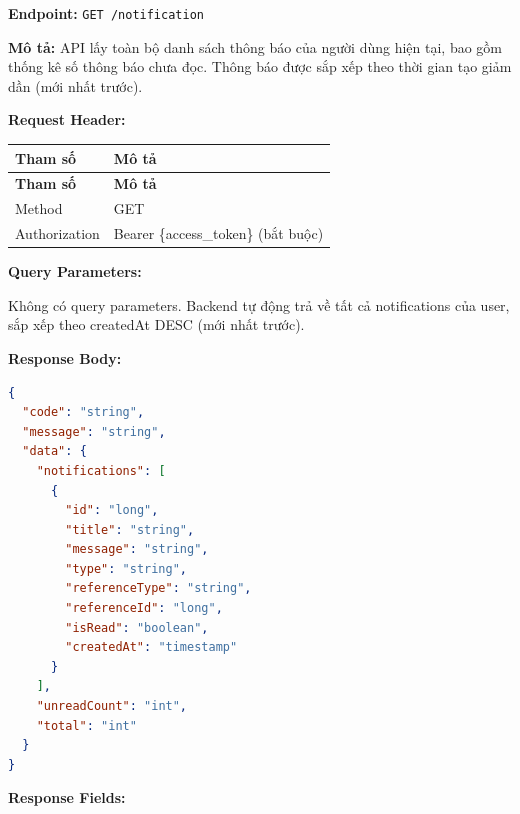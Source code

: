 \textbf{Endpoint:} \texttt{GET /notification}

\textbf{Mô tả:} API lấy toàn bộ danh sách thông báo của người dùng hiện tại, bao gồm thống kê số thông báo chưa đọc. Thông báo được sắp xếp theo thời gian tạo giảm dần (mới nhất trước).

\textbf{Request Header:}

\begin{longtable}{|p{}|p{}|}
\hline
\textbf{Tham số} & \textbf{Mô tả} \\
\hline
\endfirsthead

\hline
\textbf{Tham số} & \textbf{Mô tả} \\
\hline
\endhead

\hline
\endfoot

Method & GET \\
\hline
Authorization & Bearer \{access\_token\} (bắt buộc) \\
\hline
\end{longtable}

\textbf{Query Parameters:}

Không có query parameters. Backend tự động trả về tất cả notifications của user, sắp xếp theo createdAt DESC (mới nhất trước).

\textbf{Response Body:}

\begin{lstlisting}[language=json]
{
  "code": "string",
  "message": "string",
  "data": {
    "notifications": [
      {
        "id": "long",
        "title": "string",
        "message": "string",
        "type": "string",
        "referenceType": "string",
        "referenceId": "long",
        "isRead": "boolean",
        "createdAt": "timestamp"
      }
    ],
    "unreadCount": "int",
    "total": "int"
  }
}
\end{lstlisting}

\textbf{Response Fields:}

